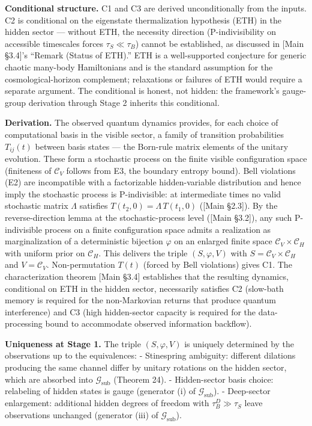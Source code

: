 \documentclass[
]{article}
\begin{document}
\textbf{Conditional structure.} C1 and C3 are derived unconditionally
from the inputs. C2 is conditional on the eigenstate thermalization
hypothesis (ETH) in the hidden sector --- without ETH, the necessity
direction (P-indivisibility on accessible timescales forces
\(\tau_S \ll \tau_B\)) cannot be established, as discussed in {[}Main
§3.4{]}'s ``Remark (Status of ETH).'' ETH is a well-supported conjecture
for generic chaotic many-body Hamiltonians and is the standard
assumption for the cosmological-horizon complement; relaxations or
failures of ETH would require a separate argument. The conditional is
honest, not hidden: the framework's gauge-group derivation through Stage
2 inherits this conditional.

\textbf{Derivation.} The observed quantum dynamics provides, for each
choice of computational basis in the visible sector, a family of
transition probabilities \(T_{ij}(t)\) between basis states --- the
Born-rule matrix elements of the unitary evolution. These form a
stochastic process on the finite visible configuration space (finiteness
of \(\mathcal{C}_V\) follows from E3, the boundary entropy bound). Bell
violations (E2) are incompatible with a factorizable hidden-variable
distribution and hence imply the stochastic process is P-indivisible: at
intermediate times no valid stochastic matrix \(\Lambda\) satisfies
\(T(t_2, 0) = \Lambda \, T(t_1, 0)\) ({[}Main §2.3{]}). By the
reverse-direction lemma at the stochastic-process level ({[}Main
§3.2{]}), any such P-indivisible process on a finite configuration space
admits a realization as marginalization of a deterministic bijection
\(\varphi\) on an enlarged finite space
\(\mathcal{C}_V \times \mathcal{C}_H\) with uniform prior on
\(\mathcal{C}_H\). This delivers the triple \((S, \varphi, V)\) with
\(S = \mathcal{C}_V \times \mathcal{C}_H\) and \(V = \mathcal{C}_V\).
Non-permutation \(T(t)\) (forced by Bell violations) gives C1. The
characterization theorem {[}Main §3.4{]} establishes that the resulting
dynamics, conditional on ETH in the hidden sector, necessarily satisfies
C2 (slow-bath memory is required for the non-Markovian returns that
produce quantum interference) and C3 (high hidden-sector capacity is
required for the data-processing bound to accommodate observed
information backflow).

\textbf{Uniqueness at Stage 1.} The triple \((S, \varphi, V)\) is
uniquely determined by the observations up to the equivalences: -
Stinespring ambiguity: different dilations producing the same channel
differ by unitary rotations on the hidden sector, which are absorbed
into \(\mathcal{G}_{\text{sub}}\) (Theorem 24). - Hidden-sector basis
choice: relabeling of hidden states is gauge (generator (i) of
\(\mathcal{G}_{\text{sub}}\)). - Deep-sector enlargement: additional
hidden degrees of freedom with \(\tau_B^D \gg \tau_S\) leave
observations unchanged (generator (iii) of
\(\mathcal{G}_{\text{sub}}\)).
\end{document}
